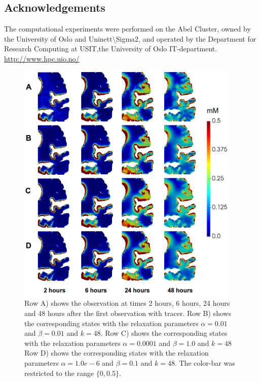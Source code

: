 \documentclass[11pt,a4paper]{article}
\begin{document}
\subsection{Acknowledgements}
The computational experiments were performed on the Abel Cluster, owned by the University of Oslo and Uninett\textbackslash Sigma2, and operated by the Department for Research Computing at USIT,the University of Oslo IT-department. \url{http://www.hpc.uio.no/} 



%



 


\clearpage
 
\begin{figure}
\centering
\includegraphics[width=0.95\textwidth]{different.png} 
\caption{Row A) shows the observation at times 2 hours, 6 hours, 24 hours and 48 hours after the first observation with tracer. Row B) shows the corresponding states with the relaxation parameters $\alpha=0.01$ and $\beta=0.01$ and $k=48$.   Row C) shows the corresponding states with the relaxation parameters $\alpha=0.0001$ and $\beta=1.0$ and $k=48$
 Row D) shows the corresponding states with the relaxation parameters $\alpha=1.0e-6$ and $\beta=0.1$ and $k=48$. The color-bar was restricted to the range $ \lbrace 0 ,0.5 \rbrace$. }
\label{Fig::realdata}
\end{figure}
\end{document}
